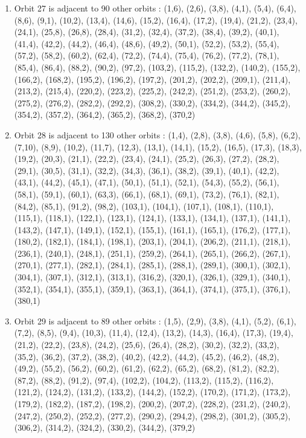\documentclass[12pt]{article}
\begin{document}
\begin{enumerate}
\item Orbit 27 is adjacent to 90 other orbits : (1,6), (2,6), (3,8), (4,1), (5,4), (6,4), (8,6), (9,1), (10,2), (13,4), (14,6), (15,2), (16,4), (17,2), (19,4), (21,2), (23,4), (24,1), (25,8), (26,8), (28,4), (31,2), (32,4), (37,2), (38,4), (39,2), (40,1), (41,4), (42,2), (44,2), (46,4), (48,6), (49,2), (50,1), (52,2), (53,2), (55,4), (57,2), (58,2), (60,2), (62,4), (72,2), (74,4), (75,4), (76,2), (77,2), (78,1), (85,4), (86,4), (88,2), (90,2), (97,2), (103,2), (115,2), (132,2), (140,2), (155,2), (166,2), (168,2), (195,2), (196,2), (197,2), (201,2), (202,2), (209,1), (211,4), (213,2), (215,4), (220,2), (223,2), (225,2), (242,2), (251,2), (253,2), (260,2), (275,2), (276,2), (282,2), (292,2), (308,2), (330,2), (334,2), (344,2), (345,2), (354,2), (357,2), (364,2), (365,2), (368,2), (370,2)
\item Orbit 28 is adjacent to 130 other orbits : (1,4), (2,8), (3,8), (4,6), (5,8), (6,2), (7,10), (8,9), (10,2), (11,7), (12,3), (13,1), (14,1), (15,2), (16,5), (17,3), (18,3), (19,2), (20,3), (21,1), (22,2), (23,4), (24,1), (25,2), (26,3), (27,2), (28,2), (29,1), (30,5), (31,1), (32,2), (34,3), (36,1), (38,2), (39,1), (40,1), (42,2), (43,1), (44,2), (45,1), (47,1), (50,1), (51,1), (52,1), (54,3), (55,2), (56,1), (58,1), (59,1), (60,1), (63,3), (66,1), (68,1), (69,1), (73,2), (76,1), (82,1), (84,2), (85,1), (91,2), (98,2), (103,1), (104,1), (107,1), (108,1), (110,1), (115,1), (118,1), (122,1), (123,1), (124,1), (133,1), (134,1), (137,1), (141,1), (143,2), (147,1), (149,1), (152,1), (155,1), (161,1), (165,1), (176,2), (177,1), (180,2), (182,1), (184,1), (198,1), (203,1), (204,1), (206,2), (211,1), (218,1), (236,1), (240,1), (248,1), (251,1), (259,2), (264,1), (265,1), (266,2), (267,1), (270,1), (277,1), (282,1), (284,1), (285,1), (288,1), (289,1), (300,1), (302,1), (304,1), (307,1), (312,1), (313,1), (316,2), (320,1), (326,1), (329,1), (340,1), (352,1), (354,1), (355,1), (359,1), (363,1), (364,1), (374,1), (375,1), (376,1), (380,1)
\item Orbit 29 is adjacent to 89 other orbits : (1,5), (2,9), (3,8), (4,1), (5,2), (6,1), (7,2), (8,5), (9,4), (10,3), (11,4), (12,4), (13,2), (14,3), (16,4), (17,3), (19,4), (21,2), (22,2), (23,8), (24,2), (25,6), (26,4), (28,2), (30,2), (32,2), (33,2), (35,2), (36,2), (37,2), (38,2), (40,2), (42,2), (44,2), (45,2), (46,2), (48,2), (49,2), (55,2), (56,2), (60,2), (61,2), (62,2), (65,2), (68,2), (81,2), (82,2), (87,2), (88,2), (91,2), (97,4), (102,2), (104,2), (113,2), (115,2), (116,2), (121,2), (124,2), (131,2), (133,2), (144,2), (152,2), (170,2), (171,2), (173,2), (179,2), (182,2), (187,2), (198,2), (200,2), (207,2), (228,2), (231,2), (240,2), (247,2), (250,2), (252,2), (277,2), (290,2), (294,2), (298,2), (301,2), (305,2), (306,2), (314,2), (324,2), (330,2), (344,2), (379,2)

\end{enumerate}
\end{document}
